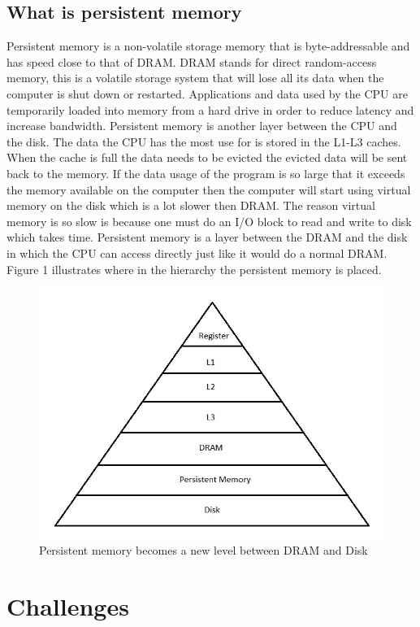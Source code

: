 \documentclass[12pt,a4paper,UKenglish]{article}
\begin{document}
\subsection{What is persistent memory}
Persistent memory\cite{Rudoff2} is a non-volatile storage memory\cite{Mahmut} that is byte-addressable and has speed close to that of DRAM. DRAM stands for direct random-access memory, this is a volatile storage system that will lose all its data when the computer is shut down or restarted. Applications and data used by the CPU are temporarily loaded into memory from a hard drive in order to reduce latency and increase bandwidth. Persistent memory is another layer between the CPU and the disk. The data the CPU has the most use for is stored in the L1-L3 caches. When the cache is full the data needs to be evicted the evicted data will be sent back to the memory. If the data usage of the program is so large that it exceeds the memory available on the computer then the computer will start using virtual memory on the disk which is a lot slower then DRAM. The reason virtual memory is so slow is because one must do an I/O block to read and write to disk which takes time. Persistent memory is a layer between the DRAM and the disk in which the CPU can access directly just like it would do a normal DRAM. Figure 1 illustrates where in the hierarchy the persistent memory is placed.
\begin{figure}
	\includegraphics[scale=0.85]{Pyramid.jpg}
	\caption{Persistent memory becomes a new level between DRAM and Disk\cite{optane}}
	\label{fig:Pyramid}
\end{figure}

\section{Challenges}
\end{document}

